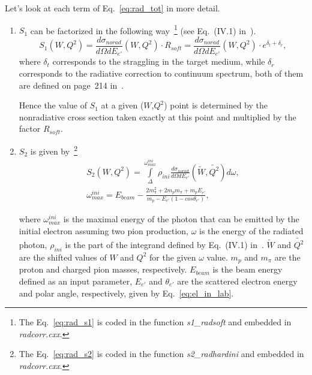 Let's look at each term of Eq.~\eqref{eq:rad_tot} in more detail.
\begin{enumerate}

\item $S_{1}$ can be factorized in the following way~\footnote[2]{The Eq.~\eqref{eq:rad_s1} is coded in the function {\em s1\_radsoft} and embedded in {\em radcorr.cxx}.} (see Eq.~(IV.1) in~\cite{Mo:1968cg}).
\begin{equation}
S_{1}(W,Q^2) = \frac{d\sigma_{norad}}{d\Omega  dE_{e'}}(W,Q^2)\cdot R_{soft} = \frac{d\sigma_{norad}}{d\Omega  dE_{e'}}(W,Q^2)\cdot e^{\delta_{t}+\delta_{r}},
\label{eq:rad_s1}
\end{equation} 
where $\delta_{t}$ corresponds to the straggling in the target medium, while $\delta_{r}$ corresponds to the radiative correction to continuum spectrum, both of them are defined on page~214 in~\cite{Mo:1968cg}.

Hence the value of $S_1$ at a given ($W$,$Q^2$) point is determined by the nonradiative cross section taken exactly at this point and multiplied by the factor $R_{soft}$.


\item $S_{2}$ is given by~\footnote[3]{The Eq.~\eqref{eq:rad_s2} is coded in the function {\em s2\_radhardini} and embedded in {\em radcorr.cxx}.}
\begin{equation}
\begin{aligned}
S_{2}(W,Q^2) = \int\limits_{\Delta}^{\omega_{max}^{ini}}\rho_{ini}\frac{d\sigma_{norad}}{d\Omega  dE_{e'}}(\widetilde{W},\widetilde{Q^{2}})d\omega, \\
\omega_{max}^{ini} = E_{beam} - \frac{2m_{\pi}^2 + 2m_{p}m_{\pi} + m_{p}E_{e'}}{m_{p}-E_{e'}(1-cos\theta_{e'})},
\label{eq:rad_s2}
\end{aligned}
\end{equation}

where $\omega_{max}^{ini}$ is the maximal energy of the photon that can be emitted by the initial electron assuming two pion production, $\omega$ is the energy of the radiated photon, $\rho_{ini}$ is the part of the integrand defined by Eq.~(IV.1) in~\cite{Mo:1968cg}. $\widetilde{W}$ and $\widetilde{Q^{2}}$ are the shifted values of $W$ and $Q^{2}$ for the given $\omega$ value. $m_{p}$ and $m_{\pi}$ are the proton and charged pion masses, respectively. $E_{beam}$ is the beam energy defined as an input parameter, $E_{e'}$ and $\theta_{e'}$ are the scattered electron energy and polar angle, respectively, given by Eq.~\eqref{eq:el_in_lab}.


\end{enumerate}
